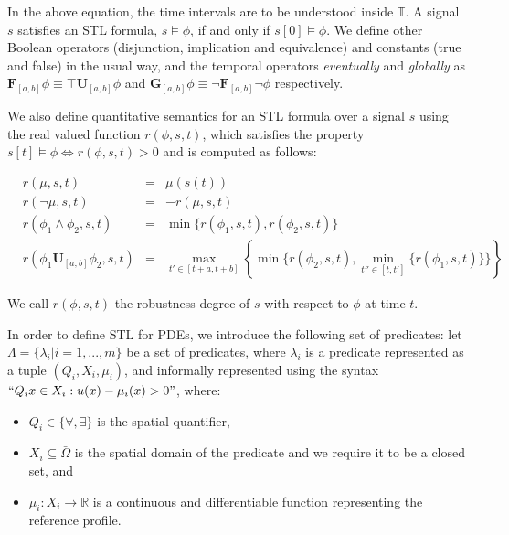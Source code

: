 \documentclass[oribibl]{llncs/llncs}
\newcommand*{\R}{\mathbb{R}}
\newcommand{\Always}{\mathbf{G}}
\newcommand{\Event}{\mathbf{F}}
\newcommand{\luntil}{\mathbf{U}}
\begin{document}
In the above equation, the time intervals are to be understood inside
$\mathbb{T}$. A signal $s$ satisfies an STL formula, $s \models \phi$, if and
only if $s[0] \models \phi$. We define other Boolean operators (disjunction,
implication and equivalence) and constants (true and false) in the usual way, 
and the temporal operators
\emph{eventually} and \emph{globally} as $\Event_{[a, b]} \phi \equiv \top
\luntil_{[a,b]} \phi$ and $\Always_{[a, b]} \phi \equiv \lnot \Event_{[a,b]}
\lnot \phi$ respectively.

We also define quantitative semantics for an STL formula over a signal $s$
using the real valued function $r(\phi, s, t)$, which satisfies the property $s[t]
\models \phi \iff r(\phi,s, t) > 0$ and is computed as follows:

\begin{equation}
    \begin{aligned}
        &r(\mu, s, t) &= &\mu(s(t)) \\
        &r(\lnot \mu, s, t) &= &-r(\mu, s,t) \\
        &r(\phi_1 \land \phi_2, s, t) &= &\min\{r(\phi_1,s, t),
    r(\phi_2,s, t)\} \\
    &r(\phi_1 \luntil_{[a,b]} \phi_2,s, t) &= 
    &\max_{t' \in [t+a, t+b]} \left \{ \min\{ r(\phi_2,s, t), 
\min_{t'' \in [t, t']}\{r(\phi_1,s, t)\}\} \right \}
    \end{aligned}
\end{equation}

We call $r(\phi,s, t)$ the robustness degree of $s$ with respect to $\phi$ at
time $t$.

In order to define STL for PDEs, we introduce the following set of predicates:
let $\Lambda = \{\lambda_i | i = 1,...,m\}$ be a set of predicates, where
$\lambda_i$ is a predicate represented as a tuple $(Q_i, X_i, \mu_i)$, and informally represented using the syntax $``Q_i x \in X_i : u(x) - \mu_i(x) >
0"$, where:

\begin{itemize}
    \item $Q_i \in \{\forall, \exists\}$ is the spatial quantifier,
    \item $X_i \subseteq \bar\Omega$ is the spatial domain of the predicate and
        we require it to be a closed set, and 
    \item $\mu_i : X_i \to \R$ is a continuous and differentiable function 
        representing the reference profile.
\end{itemize}
\end{document}
